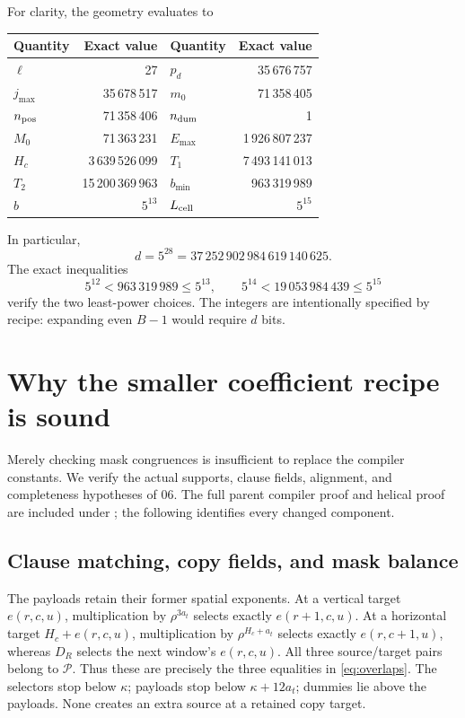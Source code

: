 \documentclass[11pt,a4paper]{article}
\theoremstyle{remark}\newtheorem{remark}[theorem]{Remark}
\newcommand{\src}[1]{\texttt{\detokenize{#1}}}
\begin{document}
For clarity, the geometry evaluates to
\begin{center}\small
\begin{tabular}{lr@{\qquad}lr}
\toprule
Quantity & Exact value & Quantity & Exact value\\
\midrule
$\ell$&27&$p_d$&35\,676\,757\\
$j_{\max}$&35\,678\,517&$m_0$&71\,358\,405\\
$n_{\rm pos}$&71\,358\,406&$n_{\rm dum}$&1\\
$M_0$&71\,363\,231&$E_{\max}$&1\,926\,807\,237\\
$H_c$&3\,639\,526\,099&$T_1$&7\,493\,141\,013\\
$T_2$&15\,200\,369\,963&$b_{\min}$&963\,319\,989\\
$b$&$5^{13}$&$L_{\rm cell}$&$5^{15}$\\
\bottomrule
\end{tabular}
\end{center}
In particular,
\begin{equation}
 \boxed{\ d=5^{28}=37\,252\,902\,984\,619\,140\,625.\ }
 \label{eq:newd}
\end{equation}
The exact inequalities
\[
 5^{12}<963\,319\,989\le5^{13},\qquad
 5^{14}<19\,053\,984\,439\le5^{15}
\]
verify the two least-power choices. The integers are intentionally
specified by recipe: expanding even $B-1$ would require $d$ bits.

\section{Why the smaller coefficient recipe is sound}
\label{sec:compilerproof}

Merely checking mask congruences is insufficient to replace the
compiler constants. We verify the actual supports, clause fields,
alignment, and completeness hypotheses of 06. The full parent
compiler proof and helical proof are included under \src{upstream};
the following identifies every changed component.

\subsection{Clause matching, copy fields, and mask balance}

The payloads retain their former spatial exponents. At a vertical
target $e(r,c,u)$, multiplication by $\rho^{3a_t}$ selects exactly
$e(r+1,c,u)$. At a horizontal target $H_c+e(r,c,u)$,
multiplication by $\rho^{H_c+a_t}$ selects exactly $e(r,c+1,u)$,
whereas $D_R$ selects the next window's $e(r,c,u)$. All three
source/target pairs belong to $\mathcal P$. Thus these are precisely
the three equalities in \eqref{eq:overlaps}. The selectors stop below
$\kappa$; payloads stop below $\kappa+12a_t$; dummies lie above the
payloads. None creates an extra source at a retained copy target.
\end{document}

